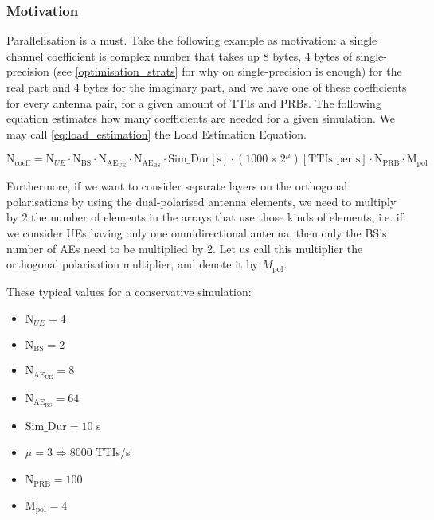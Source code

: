 \subsubsection*{Motivation}
Parallelisation is a must. Take the following example as motivation: a single channel coefficient is complex number that takes up 8 bytes, 4 bytes of single-precision (see \ref{optimisation_strats} for why on single-precision is enough) for the real part and 4 bytes for the imaginary part, and we have one of these coefficients for every antenna pair, for a given amount of \acsp{TTI} and \acsp{PRB}. The following equation estimates how many coefficients are needed for a given simulation. We may call \ref{eq:load_estimation} the Load Estimation Equation.

\begin{equation} \label{eq:load_estimation}
    \text{N}_\text{coeff} = \text{N}_{UE} \cdot \text{N}_\text{BS} \cdot \text{N}_{\text{AE}_\text{UE}} \cdot \text{N}_{\text{AE}_\text{BS}} \cdot \text{Sim\_Dur} [\text{s}] \cdot \left(1000 \times 2^\mu\right) [\text{TTIs per s}] \cdot \text{N}_{\text{PRB}} \cdot \text{M}_\text{pol}
\end{equation}

Furthermore, if we want to consider separate layers on the orthogonal polarisations by using the dual-polarised antenna elements, we need to multiply by 2 the number of elements in the arrays that use those kinds of elements, i.e. if we consider \acsp{UE} having only one omnidirectional antenna, then only the \ac{BS}'s number of \acsp{AE} need to be multiplied by 2. Let us call this multiplier the orthogonal polarisation multiplier, and denote it by $M_\text{pol}$.

These typical values for a conservative simulation:
\begin{multicols}{2}
\begin{itemize}
    \item $\text{N}_{UE} = 4$
    \item $\text{N}_\text{BS} = 2$
    \item $\text{N}_{\text{AE}_\text{UE}} = 8$
    \item $\text{N}_{\text{AE}_\text{BS}} = 64$
    \item $\text{Sim\_Dur} = 10 $ s
    \item $\mu = 3 \Rightarrow 8000  $ TTIs/s
    \item $\text{N}_{\text{PRB}} = 100$
    \item $\text{M}_\text{pol} = 4$
\end{itemize}
\end{multicols}

